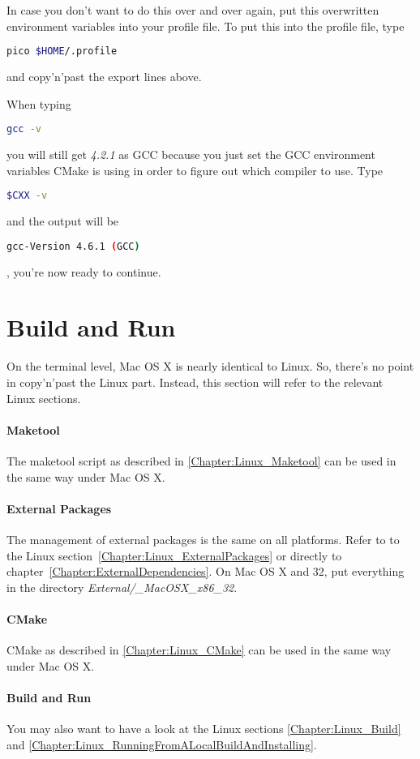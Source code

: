 In case you don't want to do this over and over again, put this overwritten environment variables into your profile file. To put this into the profile file, type
\begin{lstlisting}[language=sh]
pico $HOME/.profile
\end{lstlisting}
and copy'n'past the export lines above.

When typing
\begin{lstlisting}[language=sh]
gcc -v
\end{lstlisting}
you will still get \emph{4.2.1} as \ac{GCC} because you just set the \ac{GCC} environment variables CMake is using in order to figure out which compiler to use. Type
\begin{lstlisting}[language=sh]
$CXX -v
\end{lstlisting}
and the output will be
\begin{lstlisting}[language=sh]
gcc-Version 4.6.1 (GCC)
\end{lstlisting}
, you're now ready to continue.



\section{Build and Run}
On the terminal level, Mac OS X is nearly identical to Linux. So, there's no point in copy'n'past the Linux part. Instead, this section will refer to the relevant Linux sections.


\paragraph{Maketool}
The maketool script as described in \ref{Chapter:Linux_Maketool} can be used in the same way under Mac OS X.


\paragraph{External Packages}
The management of external packages is the same on all platforms. Refer to to the Linux section~\ref{Chapter:Linux_ExternalPackages} or directly to chapter~\ref{Chapter:ExternalDependencies}. On Mac OS X and \SI{32}{\bit}, put everything in the directory \emph{External/\_MacOSX\_x86\_32}.


\paragraph{CMake}
CMake as described in \ref{Chapter:Linux_CMake} can be used in the same way under Mac OS X.


\paragraph{Build and Run}
You may also want to have a look at the Linux sections \ref{Chapter:Linux_Build} and \ref{Chapter:Linux_RunningFromALocalBuildAndInstalling}.
